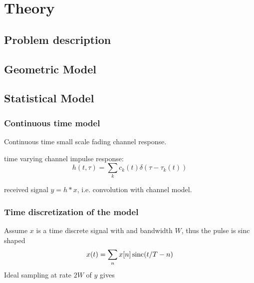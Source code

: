 
\chapter{Theory}

\section{Problem description}

\section{Geometric Model}

\section{Statistical Model}


\subsection{Continuous time model}

Continuous time small scale fading channel response.

time varying channel impulse response:
\begin{equation}
	h(t, \tau) = \sum_k c_k (t) \delta(\tau - \tau_k(t))
\end{equation}

received signal \(y = h * x\), i.e. convolution with channel model.

\subsection{Time discretization of the model}


Assume \(x\) is a time discrete signal with and bandwidth \(W\), thus the pulse is sinc shaped
\begin{equation}
	x(t) = \sum_n x[n] \operatorname{sinc}(t/T - n)
\end{equation}
Ideal sampling at rate \(2W\) of \(y\) gives

